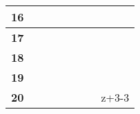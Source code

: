 \documentclass[12pt]{article}
\begin{document}
\begin{table}[h]
{\begin{tabular}{|
>{}C{1cm} |C{2cm}|C{2cm}|C{2cm}|C{2cm}|C{2cm}|C{2cm}|C{2cm}|}
\textbf{16} &                                    &                                    &                                    &                                    &                                    &                                    &                                    \\ \hline
\textbf{17} &                                    &                                    &                                    &                                    &                                    &                                    &                                    \\ \hline
\textbf{18} &                                    &                                    &                                    &                                    &                                    &                                    &                                    \\ \hline
\textbf{19} &                                    &                                    &                                    &                                    &                                    &                                    &                                    \\ \hline
\textbf{20} &                                    &                                    &                                    &                                    &                                    &                                    & z+3-3                              \\ \hline
\end{tabular}%
}
\end{table}
\end{document}
